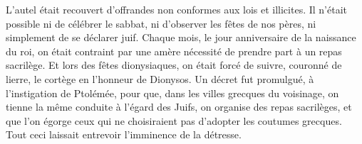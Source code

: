 L’autel était recouvert d’offrandes non conformes aux lois et illicites.
Il n’était possible ni de célébrer le sabbat, ni d’observer les fêtes de nos pères,
	ni simplement de se déclarer juif.
Chaque mois, le jour anniversaire de la naissance du roi,
	on était contraint par une amère nécessité de prendre part à un repas sacrilège.
Et lors des fêtes dionysiaques,
	on était forcé de suivre, couronné de lierre, le cortège en l’honneur de Dionysos.
Un décret fut promulgué, à l’instigation de Ptolémée,
	pour que, dans les villes grecques du voisinage,
	on tienne la même conduite à l’égard des Juifs,
	on organise des repas sacrilèges,
	et que l’on égorge ceux qui ne choisiraient pas d’adopter les coutumes grecques.
Tout ceci laissait entrevoir l’imminence de la détresse.
